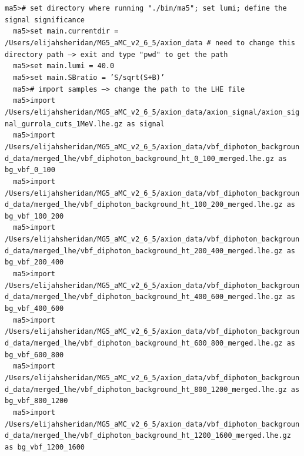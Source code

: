 \documentclass[a4paper, 10pt]{article}
\begin{document}
\texttt{ma5>\# set directory where running "./\-bin/\-ma5"; set lumi; define the signal significance\\
}
\texttt{ }\texttt{ }\texttt{ma5>set main.currentdir = /\-Users/\-elijahsheridan/\-MG5\_aMC\_v2\_6\_5/\-axion\_data \# need to change this directory path --> exit and type "pwd" to get the path\\
}
\texttt{ }\texttt{ }\texttt{ma5>set main.lumi = 40.0\\
}
\texttt{ }\texttt{ }\texttt{ma5>set main.SBratio = 'S/\-sqrt(S+B)'\\
}
\texttt{ }\texttt{ }\texttt{ma5>\# import samples --> change the path to the LHE file\\
}
\texttt{ }\texttt{ }\texttt{ma5>import /\-Users/\-elijahsheridan/\-MG5\_aMC\_v2\_6\_5/\-axion\_data/\-axion\_signal/\-axion\_signal\_gurrola\_cuts\_1MeV.lhe.gz as signal\\
}
\texttt{ }\texttt{ }\texttt{ma5>import /\-Users/\-elijahsheridan/\-MG5\_aMC\_v2\_6\_5/\-axion\_data/\-vbf\_diphoton\_background\_data/\-merged\_lhe/\-vbf\_diphoton\_background\_ht\_0\_100\_merged.lhe.gz as bg\_vbf\_0\_100\\
}
\texttt{ }\texttt{ }\texttt{ma5>import /\-Users/\-elijahsheridan/\-MG5\_aMC\_v2\_6\_5/\-axion\_data/\-vbf\_diphoton\_background\_data/\-merged\_lhe/\-vbf\_diphoton\_background\_ht\_100\_200\_merged.lhe.gz as bg\_vbf\_100\_200\\
}
\texttt{ }\texttt{ }\texttt{ma5>import /\-Users/\-elijahsheridan/\-MG5\_aMC\_v2\_6\_5/\-axion\_data/\-vbf\_diphoton\_background\_data/\-merged\_lhe/\-vbf\_diphoton\_background\_ht\_200\_400\_merged.lhe.gz as bg\_vbf\_200\_400\\
}
\texttt{ }\texttt{ }\texttt{ma5>import /\-Users/\-elijahsheridan/\-MG5\_aMC\_v2\_6\_5/\-axion\_data/\-vbf\_diphoton\_background\_data/\-merged\_lhe/\-vbf\_diphoton\_background\_ht\_400\_600\_merged.lhe.gz as bg\_vbf\_400\_600\\
}
\texttt{ }\texttt{ }\texttt{ma5>import /\-Users/\-elijahsheridan/\-MG5\_aMC\_v2\_6\_5/\-axion\_data/\-vbf\_diphoton\_background\_data/\-merged\_lhe/\-vbf\_diphoton\_background\_ht\_600\_800\_merged.lhe.gz as bg\_vbf\_600\_800\\
}
\texttt{ }\texttt{ }\texttt{ma5>import /\-Users/\-elijahsheridan/\-MG5\_aMC\_v2\_6\_5/\-axion\_data/\-vbf\_diphoton\_background\_data/\-merged\_lhe/\-vbf\_diphoton\_background\_ht\_800\_1200\_merged.lhe.gz as bg\_vbf\_800\_1200\\
}
\texttt{ }\texttt{ }\texttt{ma5>import /\-Users/\-elijahsheridan/\-MG5\_aMC\_v2\_6\_5/\-axion\_data/\-vbf\_diphoton\_background\_data/\-merged\_lhe/\-vbf\_diphoton\_background\_ht\_1200\_1600\_merged.lhe.gz as bg\_vbf\_1200\_1600\\
}
\end{document}
